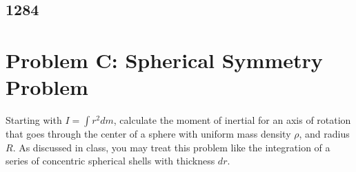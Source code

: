 \documentclass{article}
\begin{document}
\subsection{1284}

\section{Problem C: Spherical Symmetry Problem}

Starting with $ I = \int r^2dm $, calculate the moment of inertial for an axis of rotation that goes through the center of a sphere with uniform mass density $ \rho $, and radius $ R $. As discussed in class, you may treat this problem like the integration of a series of concentric spherical shells with thickness $ dr $.
\end{document}
